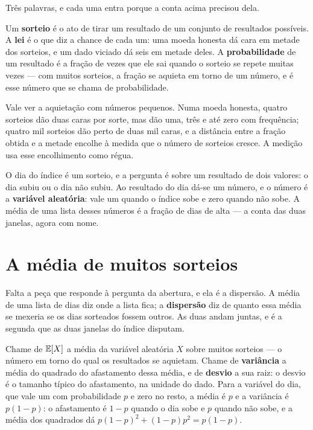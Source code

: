 Três palavras, e cada uma entra porque a conta acima precisou dela.

Um \textbf{sorteio} é o ato de tirar um resultado de um conjunto de resultados possíveis. A
\textbf{lei} é o que diz a chance de cada um: uma moeda honesta dá cara em metade dos sorteios,
e um dado viciado dá seis em metade deles.
A \textbf{probabilidade} de um resultado é a fração
de vezes que ele sai quando o sorteio se repete muitas vezes --- com muitos sorteios, a fração
se aquieta em torno de um número, e é esse número que se chama de probabilidade\cite{kolmogorov1933grundbegriffe,shafer2006sources}.

Vale ver a aquietação com números pequenos. Numa moeda honesta, quatro sorteios dão duas caras
por sorte, mas dão uma, três e até zero com frequência; quatro mil sorteios dão perto de duas
mil caras, e a distância entre a fração obtida e a metade encolhe à medida que o número de
sorteios cresce. A medição usa esse encolhimento como régua.

O dia do índice é um sorteio, e a pergunta é sobre um resultado de dois valores: o
dia subiu ou o dia não subiu. Ao resultado do dia dá-se um número, e o número é a
\textbf{variável aleatória}: vale um quando o índice sobe e zero quando não sobe. A
média de uma lista desses números é a fração de dias de alta --- a conta das duas janelas, agora
com nome.

\section{A média de muitos sorteios}

Falta a peça que responde à pergunta da abertura, e ela é a dispersão. A média de uma lista de
dias diz onde a lista fica; a \textbf{dispersão} diz de quanto essa média se mexeria se os dias
sorteados fossem outros. As duas andam juntas, e é a segunda que as duas janelas do índice
disputam.

Chame de $\mathbb{E}[X]$ a média da variável aleatória $X$ sobre muitos sorteios --- o número em torno
do qual os resultados se aquietam.
Chame de \textbf{variância} a média do quadrado do
afastamento dessa média, e de \textbf{desvio} a sua raiz: o desvio é o tamanho típico do
afastamento, na unidade do dado. Para a variável do dia, que vale um com probabilidade $p$ e
zero no resto, a média é $p$ e a variância é $p(1-p)$: o afastamento é $1-p$ quando o dia sobe
e $p$ quando não sobe, e a média dos quadrados dá $p(1-p)^2 + (1-p)p^2 = p(1-p)$.

